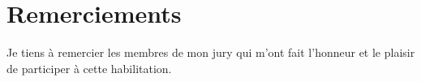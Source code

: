 \chapter*{Remerciements}
Je tiens à remercier les membres de mon jury qui m'ont fait l'honneur
et le plaisir de participer à cette habilitation. 
